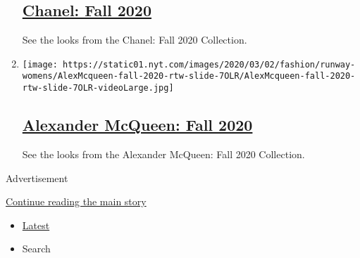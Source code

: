 \begin{enumerate}
{  \subsection{\texorpdfstring{\href{/slideshow/2020/03/03/fashion/runway-womens/chanel-fall-2020.html}{Chanel:
  Fall 2020}}{Chanel: Fall 2020}}\label{chanel-fall-2020}}

  See the looks from the Chanel: Fall 2020 Collection.
\item
  \texttt{[image: https://static01.nyt.com/images/2020/03/02/fashion/runway-womens/AlexMcqueen-fall-2020-rtw-slide-7OLR/AlexMcqueen-fall-2020-rtw-slide-7OLR-videoLarge.jpg]}

  \hypertarget{alexander-mcqueen-fall-2020}{%
  \subsection{\texorpdfstring{\href{/slideshow/2020/03/02/fashion/runway-womens/alexander-mcqueen-fall-2020.html}{Alexander
  McQueen: Fall
  2020}}{Alexander McQueen: Fall 2020}}\label{alexander-mcqueen-fall-2020}}

  See the looks from the Alexander McQueen: Fall 2020 Collection.
\end{enumerate}

Advertisement

\protect\hyperlink{after-mid7}{Continue reading the main story}

\begin{itemize}
\tightlist
\item
  \protect\hyperlink{stream-panel}{Latest}
\item
  Search
\end{itemize}

